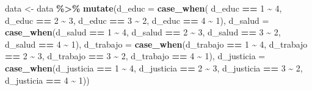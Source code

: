 \documentclass[
]{article}
\newenvironment{Shaded}{\begin{snugshade}}{\end{snugshade}}
\newcommand{\AttributeTok}[1]{\textcolor[rgb]{0.13,0.29,0.53}{#1}}
\newcommand{\DecValTok}[1]{\textcolor[rgb]{0.00,0.00,0.81}{#1}}
\newcommand{\FunctionTok}[1]{\textcolor[rgb]{0.13,0.29,0.53}{\textbf{#1}}}
\newcommand{\NormalTok}[1]{#1}
\newcommand{\OtherTok}[1]{\textcolor[rgb]{0.56,0.35,0.01}{#1}}
\newcommand{\SpecialCharTok}[1]{\textcolor[rgb]{0.81,0.36,0.00}{\textbf{#1}}}
\begin{document}
\begin{Shaded}
\begin{Highlighting}[]
\NormalTok{data }\OtherTok{\textless{}{-}}\NormalTok{ data }\SpecialCharTok{\%\textgreater{}\%}
  \FunctionTok{mutate}\NormalTok{(}\AttributeTok{d\_educ =} \FunctionTok{case\_when}\NormalTok{( d\_educ }\SpecialCharTok{==} \DecValTok{1} \SpecialCharTok{\textasciitilde{}} \DecValTok{4}\NormalTok{,}
\NormalTok{                            d\_educ }\SpecialCharTok{==} \DecValTok{2} \SpecialCharTok{\textasciitilde{}} \DecValTok{3}\NormalTok{,}
\NormalTok{                            d\_educ }\SpecialCharTok{==} \DecValTok{3} \SpecialCharTok{\textasciitilde{}} \DecValTok{2}\NormalTok{,}
\NormalTok{                            d\_educ }\SpecialCharTok{==} \DecValTok{4} \SpecialCharTok{\textasciitilde{}} \DecValTok{1}\NormalTok{),}
      \AttributeTok{d\_salud =} \FunctionTok{case\_when}\NormalTok{(d\_salud }\SpecialCharTok{==} \DecValTok{1} \SpecialCharTok{\textasciitilde{}} \DecValTok{4}\NormalTok{,}
\NormalTok{                          d\_salud }\SpecialCharTok{==} \DecValTok{2} \SpecialCharTok{\textasciitilde{}} \DecValTok{3}\NormalTok{,}
\NormalTok{                          d\_salud }\SpecialCharTok{==} \DecValTok{3} \SpecialCharTok{\textasciitilde{}} \DecValTok{2}\NormalTok{,}
\NormalTok{                          d\_salud }\SpecialCharTok{==} \DecValTok{4} \SpecialCharTok{\textasciitilde{}} \DecValTok{1}\NormalTok{),}
      \AttributeTok{d\_trabajo =} \FunctionTok{case\_when}\NormalTok{(d\_trabajo }\SpecialCharTok{==} \DecValTok{1} \SpecialCharTok{\textasciitilde{}} \DecValTok{4}\NormalTok{,}
\NormalTok{                            d\_trabajo }\SpecialCharTok{==} \DecValTok{2} \SpecialCharTok{\textasciitilde{}} \DecValTok{3}\NormalTok{,}
\NormalTok{                            d\_trabajo }\SpecialCharTok{==} \DecValTok{3} \SpecialCharTok{\textasciitilde{}} \DecValTok{2}\NormalTok{,}
\NormalTok{                            d\_trabajo }\SpecialCharTok{==} \DecValTok{4} \SpecialCharTok{\textasciitilde{}} \DecValTok{1}\NormalTok{),}
      \AttributeTok{d\_justicia =} \FunctionTok{case\_when}\NormalTok{(d\_justicia }\SpecialCharTok{==} \DecValTok{1} \SpecialCharTok{\textasciitilde{}} \DecValTok{4}\NormalTok{,}
\NormalTok{                             d\_justicia }\SpecialCharTok{==} \DecValTok{2} \SpecialCharTok{\textasciitilde{}} \DecValTok{3}\NormalTok{,}
\NormalTok{                             d\_justicia }\SpecialCharTok{==} \DecValTok{3} \SpecialCharTok{\textasciitilde{}} \DecValTok{2}\NormalTok{,}
\NormalTok{                             d\_justicia }\SpecialCharTok{==} \DecValTok{4} \SpecialCharTok{\textasciitilde{}} \DecValTok{1}\NormalTok{))}
\end{Highlighting}
\end{Shaded}
\end{document}
